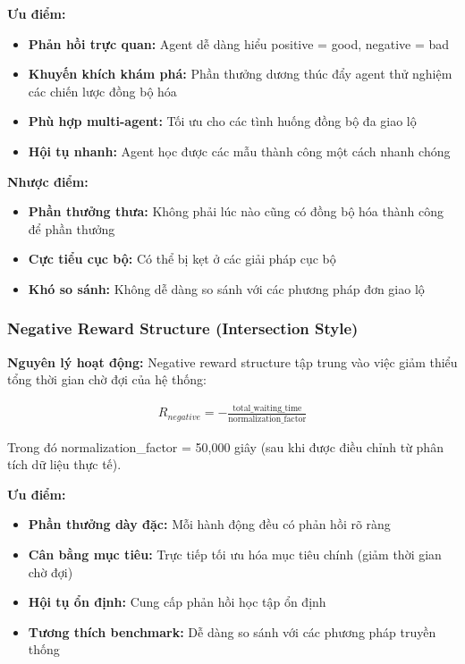 \textbf{Ưu điểm:}
\begin{itemize}
    \item \textbf{Phản hồi trực quan:} Agent dễ dàng hiểu positive = good, negative = bad

    \item \textbf{Khuyến khích khám phá:} Phần thưởng dương thúc đẩy agent thử nghiệm các chiến lược đồng bộ hóa

    \item \textbf{Phù hợp multi-agent:} Tối ưu cho các tình huống đồng bộ đa giao lộ

    \item \textbf{Hội tụ nhanh:} Agent học được các mẫu thành công một cách nhanh chóng
\end{itemize}

\textbf{Nhược điểm:}
\begin{itemize}
    \item \textbf{Phần thưởng thưa:} Không phải lúc nào cũng có đồng bộ hóa thành công để phần thưởng

    \item \textbf{Cực tiểu cục bộ:} Có thể bị kẹt ở các giải pháp cục bộ

    \item \textbf{Khó so sánh:} Không dễ dàng so sánh với các phương pháp đơn giao lộ
\end{itemize}

\subsubsection{Negative Reward Structure (Intersection Style)}

\textbf{Nguyên lý hoạt động:} Negative reward structure tập trung vào việc giảm
thiểu tổng thời gian chờ đợi của hệ thống:

\begin{align}
    R_{negative} = -\frac{\text{total\_waiting\_time}}{\text{normalization\_factor}}
\end{align}

Trong đó normalization\_factor = 50,000 giây (sau khi được điều chỉnh từ phân
tích dữ liệu thực tế).

\textbf{Ưu điểm:}
\begin{itemize}
    \item \textbf{Phần thưởng dày đặc:} Mỗi hành động đều có phản hồi rõ ràng

    \item \textbf{Cân bằng mục tiêu:} Trực tiếp tối ưu hóa mục tiêu chính (giảm
        thời gian chờ đợi)

    \item \textbf{Hội tụ ổn định:} Cung cấp phản hồi học tập ổn định

    \item \textbf{Tương thích benchmark:} Dễ dàng so sánh với các phương pháp
        truyền thống
\end{itemize}


